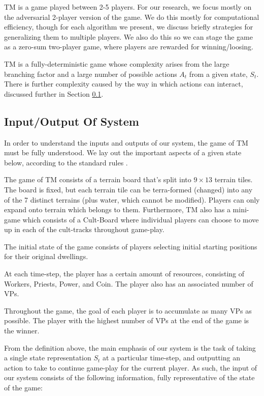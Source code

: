 \documentclass[10pt,twocolumn,letterpaper]{article}
\begin{document}
TM is a game played between 2-5 players. For our research, we focus mostly on the adversarial 2-player version of the game. We do this mostly for computational efficiency, though for each algorithm we present, we discuss briefly strategies for generalizing them to multiple players. We also do this so we can stage the game as a zero-sum two-player game, where players are rewarded for winning/loosing.

TM is a fully-deterministic game whose complexity arises from the large branching factor and a large number of possible actions $A_t$ from a given state, $S_t$. There is further complexity caused by the way in which actions can interact, discussed further in Section \ref{subsection:input/output_of_system}.
\subsection{Input/Output Of System}
\label{subsection:input/output_of_system}
In order to understand the inputs and outputs of our system, the game of TM must be fully understood. We lay out the important aspects of a given state below, according to the standard rules \cite{TMRules}.

The game of TM consists of a terrain board that's split into $9 \times 13$ terrain tiles. The board is fixed, but each terrain tile can be terra-formed (changed) into any of the 7 distinct terrains (plus water, which cannot be modified). Players can only expand onto terrain which belongs to them. Furthermore, TM also has a mini-game which consists of a Cult-Board where individual players can choose to move up in each of the cult-tracks throughout game-play. 

The initial state of the game consists of players selecting initial starting positions for their original dwellings. 

At each time-step, the player has a certain amount of resources, consisting of Workers, Priests, Power, and Coin. The player also has an associated number of VPs.

Throughout the game, the goal of each player is to accumulate as many VPs as possible. The player with the highest number of VPs at the end of the game is the winner.

From the definition above, the main emphasis of our system is the task of taking a single state representation $S_t$ at a particular time-step, and outputting an action to take to continue game-play for the current player. As such, the input of our system consists of the following information, fully representative of the state of the game:
\end{document}
